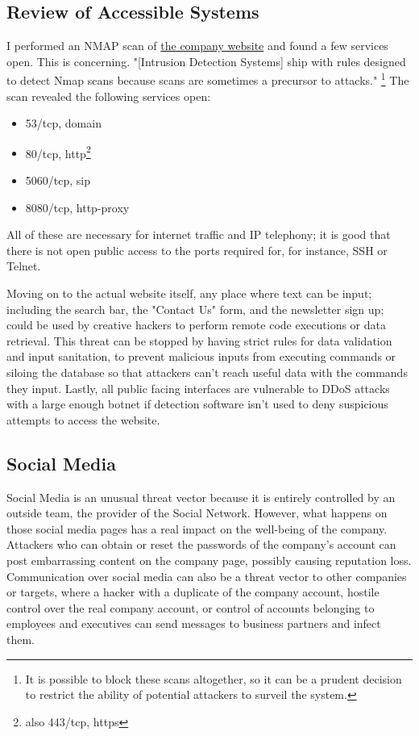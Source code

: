 \documentclass[12pt]{article}
\let\footcite\footfullcite
\begin{document}
\subsection{Review of Accessible Systems}
I performed an NMAP scan of \hyperlink{iss.shipping.com}{the company website} and found a few services open. This is concerning. "[Intrusion Detection Systems] ship with rules designed to detect Nmap scans because scans are sometimes a precursor to attacks."\footcite{noauthor_chapter_nodate} \footnote{It is possible to block these scans altogether, so it can be a prudent decision to restrict the ability of potential attackers to surveil the system.} The scan revealed the following services open:
\begin{itemize}
    \item 53/tcp, domain
    \item 80/tcp, http\footnote{also 443/tcp, https}
    \item 5060/tcp, sip
    \item 8080/tcp, http-proxy
\end{itemize}
All of these are necessary for internet traffic and IP telephony; it is good that there is not open public access to the ports required for, for instance, SSH or Telnet.

Moving on to the actual website itself, any place where text can be input; including the search bar, the "Contact Us" form, and the newsletter sign up; could be used by creative hackers to perform remote code executions or data retrieval. This threat can be stopped by having strict rules for data validation and input sanitation, to prevent malicious inputs from executing commands or siloing the database so that attackers can't reach useful data with the commands they input. Lastly, all public facing interfaces are vulnerable to DDoS attacks with a large enough botnet if detection software isn't used to deny suspicious attempts to access the website.
\subsection{Social Media}
Social Media is an unusual threat vector because it is entirely controlled by an outside team, the provider of the Social Network. However, what happens on those social media pages has a real impact on the well-being of the company. Attackers who can obtain or reset the passwords of the company's account can post embarrassing content on the company page, possibly causing reputation loss\footcite{bastug_risk_2023}. Communication over social media can also be a threat vector to other companies or targets, where a hacker with a duplicate of the company account, hostile control over the real company account, or control of accounts belonging to employees and executives can send messages to business partners and infect them.
\end{document}
